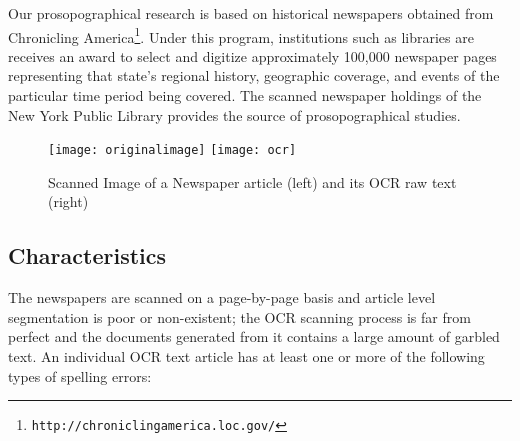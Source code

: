 Our prosopographical research is based on historical newspapers obtained from Chronicling America\footnote{\texttt{http://chroniclingamerica.loc.gov/}}. 
Under this program, institutions such as libraries are receives an award to select and digitize approximately 100,000 newspaper pages representing that state's regional history, geographic coverage, and events of the particular time period being covered. The scanned newspaper holdings of the New York Public Library provides the source of prosopographical studies. 

\begin{figure*}
\texttt{[image: originalimage]}
\texttt{[image: ocr]}
\caption{Scanned Image of a Newspaper article (left) and its OCR raw text (right)}
\label{figure:1}
\end{figure*}

\subsection{Characteristics}
The newspapers are scanned on a page-by-page basis and article level
segmentation is poor or non-existent; the OCR scanning process is far
from perfect and the documents generated from it contains a large
amount of garbled text.
An individual OCR text article has at least one or more of the following types of spelling errors:

